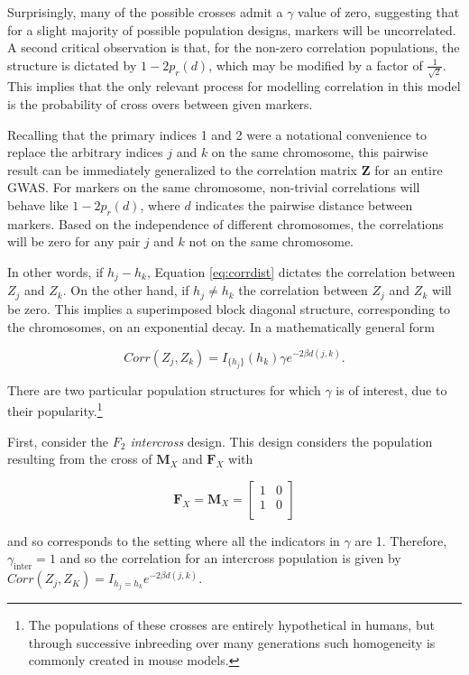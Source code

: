 \documentclass{article}
\newcommand{\ve}[1]{\mathbf{#1}}           %
\newcommand{\m}[1]{\mathbf{#1}}               %
\newcommand{\ind}[2]{I_{#2} \left( #1 \right)}
\begin{document}
Surprisingly, many of the possible crosses admit a $\gamma$ value of zero, suggesting that for a slight majority of possible population designs, markers will be uncorrelated. A second critical observation is that, for the non-zero correlation populations, the structure is dictated by $1 - 2p_r(d)$, which may be modified by a factor of $\frac{1}{\sqrt{2}}$. This implies that the only relevant process for modelling correlation in this model is the probability of cross overs between given markers.

Recalling that the primary indices 1 and 2 were a notational convenience to replace the arbitrary indices $j$ and $k$ on the same chromosome, this pairwise result can be immediately generalized to the correlation matrix $\ve{Z}$ for an entire GWAS. For markers on the same chromosome, non-trivial correlations will behave like $1 - 2p_r(d)$, where $d$ indicates the pairwise distance between markers. Based on the independence of different chromosomes, the correlations will be zero for any pair $j$ and $k$ not on the same chromosome.

In other words, if $h_j - h_k$, Equation \ref{eq:corrdist} dictates the correlation between $Z_j$ and $Z_k$. On the other hand, if $h_j \neq h_k$ the correlation between $Z_j$ and $Z_k$ will be zero. This implies a superimposed block diagonal structure, corresponding to the chromosomes, on an exponential decay. In a mathematically general form

\begin{equation} \label{eq:zcorr}
  Corr(Z_j, Z_k) = \ind{h_k}{\{h_j\}} \gamma e^{-2 \beta d(j,k)}.
\end{equation}

\noindent There are two particular population structures for which $\gamma$ is of interest, due to their popularity.\footnote{The populations of these crosses are entirely hypothetical in humans, but through successive inbreeding over many generations such homogeneity is commonly created in mouse models.}

First, consider the \textit{$F_2$ intercross} design. This design considers the population resulting from the cross of $\m{M}_X$ and $\m{F}_X$ with

$$\m{F}_X = \m{M}_X = \begin{bmatrix}
  1 & 0 \\
  1 & 0 \\
\end{bmatrix}$$

\noindent and so corresponds to the setting where all the indicators in $\gamma$ are 1. Therefore, $\gamma_{\text{inter}} = 1$ and so the correlation for an intercross population is given by $Corr(Z_j, Z_K) = I_{h_j = h_k} e^{-2 \beta d(j,k)}$.
\end{document}
